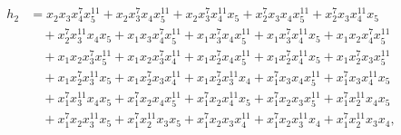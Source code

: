 \documentclass[reqno]{amsart}
\theoremstyle{plain}
\theoremstyle{definition}
\theoremstyle{plain}
\theoremstyle{definition}
\numberwithin{equation}{section}
\begin{document}
\begin{align*}
h_2 &= x_2x_3x_4^{7}x_5^{11} + x_2x_3^{7}x_4x_5^{11} + x_2x_3^{7}x_4^{11}x_5 + x_2^{7}x_3x_4x_5^{11} + x_2^{7}x_3x_4^{11}x_5\\ &\quad + x_2^{7}x_3^{11}x_4x_5 + x_1x_3x_4^{7}x_5^{11} + x_1x_3^{7}x_4x_5^{11} + x_1x_3^{7}x_4^{11}x_5 + x_1x_2x_4^{7}x_5^{11}\\ &\quad + x_1x_2x_3^{7}x_5^{11} + x_1x_2x_3^{7}x_4^{11} + x_1x_2^{7}x_4x_5^{11} + x_1x_2^{7}x_4^{11}x_5 + x_1x_2^{7}x_3x_5^{11}\\ &\quad + x_1x_2^{7}x_3^{11}x_5 + x_1x_2^{7}x_3x_4^{11} + x_1x_2^{7}x_3^{11}x_4 + x_1^{7}x_3x_4x_5^{11} + x_1^{7}x_3x_4^{11}x_5\\ &\quad + x_1^{7}x_3^{11}x_4x_5 + x_1^{7}x_2x_4x_5^{11} + x_1^{7}x_2x_4^{11}x_5 + x_1^{7}x_2x_3x_5^{11} + x_1^{7}x_2^{11}x_4x_5\\ &\quad + x_1^{7}x_2x_3^{11}x_5 + x_1^{7}x_2^{11}x_3x_5 + x_1^{7}x_2x_3x_4^{11} + x_1^{7}x_2x_3^{11}x_4 + x_1^{7}x_2^{11}x_3x_4,\\

\end{align*}
\end{document}
